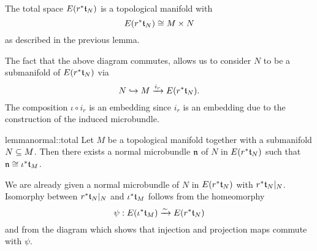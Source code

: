 \begin{myparagraph}
    The total space $E(r^*\mathfrak{t}_N)$ is a topological manifold with
    \[ E(r^*\mathfrak{t}_N) \cong M \times N \]
    as described in the previous lemma.

    The fact that the above diagram commutes,
    allows us to consider $N$ to be a submanifold of $E(r^*\mathfrak{t}_N)$ via
    \[ N \hookrightarrow{} M \xrightarrow{i_r} E(r^*\mathfrak{t}_N). \]
    The composition $\iota \circ i_r$ is an embedding since $i_r$ is an embedding
    due to the construction of the induced microbundle.
\end{myparagraph}

\begin{mystatement}{lemma}{normal::total}
    Let $M$ be a topological manifold together with a submanifold $N \subseteq{} M$.
    Then there exists a normal microbundle $\mathfrak{n}$ of $N$ in $E(r^*\mathfrak{t}_N)$ such that $\mathfrak{n} \cong \iota^*\mathfrak{t}_M$.
\end{mystatement}

\begin{myproof}
    We are already given a normal microbundle of $N$ in $E(r^*\mathfrak{t}_N)$ with $r^*\mathfrak{t}_N\vert_{N}$.
    Isomorphy between $r^*\mathfrak{t}_N\vert_{N}$ and $\iota^*\mathfrak{t}_M$ follows from the homeomorphy
    \[ \psi: E(\iota^*\mathfrak{t}_M) \xrightarrow{\sim} E(r^*\mathfrak{t}_N) \]
    and from the diagram which shows that injection and projection maps commute with $\psi$.
\end{myproof}